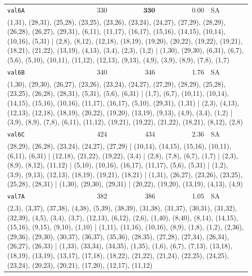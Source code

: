 \begin{longtable}{lrrrl}
\texttt{val6A} & 330 & $\mathbf{330}$ & 0.00 & SA \\
\multicolumn{5}{p{0.96\linewidth}}{\tiny\raggedright\arraybackslash (1,31), (28,31), (25,28), (23,25), (23,26), (23,24), (24,27), (27,29), (28,29), (26,28), (26,27), (29,31), (6,11), (11,17), (16,17), (15,16), (14,15), (10,14), (10,16), (5,31) | (2,8), (8,12), (12,18), (18,19), (19,20), (20,22), (19,22), (19,21), (18,21), (21,22), (13,19), (4,13), (3,4), (2,3), (1,2) | (1,30), (29,30), (6,31), (6,7), (5,6), (5,10), (10,11), (11,12), (12,13), (9,13), (4,9), (3,9), (8,9), (7,8), (1,7)} \\[2pt]
\texttt{val6B} & 340 & 346 & 1.76 & SA \\
\multicolumn{5}{p{0.96\linewidth}}{\tiny\raggedright\arraybackslash (1,30), (29,30), (26,27), (23,26), (23,24), (24,27), (27,29), (28,29), (25,28), (23,25), (26,28), (28,31), (5,31), (5,6), (6,31) | (1,7), (6,7), (10,11), (10,14), (14,15), (15,16), (10,16), (11,17), (16,17), (5,10), (29,31), (1,31) | (2,3), (4,13), (12,13), (12,18), (18,19), (20,22), (19,20), (13,19), (9,13), (4,9), (3,4), (1,2) | (3,9), (8,9), (7,8), (6,11), (11,12), (19,21), (19,22), (21,22), (18,21), (8,12), (2,8)} \\[2pt]
\texttt{val6C} & 424 & 434 & 2.36 & SA \\
\multicolumn{5}{p{0.96\linewidth}}{\tiny\raggedright\arraybackslash (28,29), (26,28), (23,24), (24,27), (27,29) | (10,14), (14,15), (15,16), (10,11), (6,11), (6,31) | (12,18), (21,22), (19,22), (3,4) | (2,8), (7,8), (6,7), (1,7) | (2,3), (8,9), (8,12), (11,12) | (5,10), (10,16), (16,17), (11,17), (5,6), (5,31) | (1,2), (3,9), (9,13), (12,13), (18,19), (19,21), (18,21) | (1,31), (26,27), (23,26), (23,25), (25,28), (28,31) | (1,30), (29,30), (29,31) | (20,22), (19,20), (13,19), (4,13), (4,9)} \\[2pt]
\texttt{val7A} & 382 & 386 & 1.05 & SA \\
\multicolumn{5}{p{0.96\linewidth}}{\tiny\raggedright\arraybackslash (2,3), (3,37), (37,38), (4,38), (5,39), (38,39), (31,38), (31,37), (30,31), (31,32), (32,39), (4,5), (3,4), (3,7), (12,13), (6,12), (2,6), (1,40), (8,40), (8,14), (14,15), (15,16), (9,15), (9,10), (1,10) | (1,11), (11,16), (10,16), (8,9), (1,8), (1,2), (2,36), (29,36), (29,30), (30,37), (36,37), (35,36), (28,35), (27,28), (27,34), (26,34), (26,27), (26,33) | (1,33), (33,34), (34,35), (1,35), (1,6), (6,7), (7,13), (13,18), (18,19), (13,19), (13,17), (17,18), (18,22), (21,22), (21,24), (22,25), (24,25), (23,24), (20,23), (20,21), (17,20), (12,17), (11,12)} \\[2pt]

\end{longtable}
